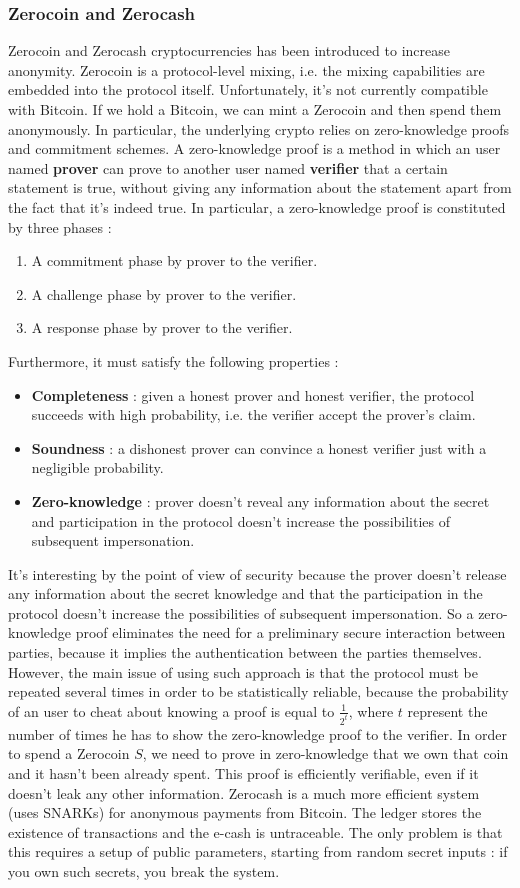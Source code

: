 \subsubsection{Zerocoin and Zerocash}
Zerocoin and Zerocash cryptocurrencies has been introduced to increase anonymity. Zerocoin is a protocol-level mixing, i.e. the mixing capabilities are embedded into the protocol itself. Unfortunately, it's not currently compatible with Bitcoin. If we hold a Bitcoin, we can mint a Zerocoin and then spend them anonymously. In particular, the underlying crypto relies on zero-knowledge proofs and commitment schemes. A zero-knowledge proof is a method in which an user named \textbf{prover} can prove to another user named \textbf{verifier} that a certain statement is true, without giving any information about the statement apart from the fact that it's indeed true. In particular, a zero-knowledge proof is constituted by three phases :
\begin{enumerate}
\item A commitment phase by prover to the verifier.
\item A challenge phase by prover to the verifier.
\item A response phase by prover to the verifier.
\end{enumerate}
Furthermore, it must satisfy the following properties :
\begin{itemize}
\item \textbf{Completeness} : given a honest prover and honest verifier, the protocol succeeds with high probability, i.e. the verifier accept the prover's claim.
\item \textbf{Soundness} : a dishonest prover can convince a honest verifier just with a negligible probability.
\item \textbf{Zero-knowledge} : prover doesn't reveal any information about the secret and participation in the protocol doesn't increase the possibilities of subsequent impersonation.
\end{itemize}
It's interesting by the point of view of security because the prover doesn't release any information about the secret knowledge and that the participation in the protocol doesn't increase the possibilities of subsequent impersonation. So a zero-knowledge proof eliminates the need for a preliminary secure interaction between parties, because it implies the authentication between the parties themselves. However, the main issue of using such approach is that the protocol must be repeated several times in order to be statistically reliable, because the probability of an user to cheat about knowing a proof is equal to $\frac{1}{2^{t}}$, where $t$ represent the number of times he has to show the zero-knowledge proof to the verifier. In order to spend a Zerocoin $S$, we need to prove in zero-knowledge that we own that coin and it hasn't been already spent. This proof is efficiently verifiable, even if it doesn't leak any other information. Zerocash is a much more efficient system (uses SNARKs) for anonymous payments from Bitcoin. The ledger stores the existence of transactions and the e-cash is untraceable. The only problem is that this requires a setup of public parameters, starting from random secret inputs : if you own such secrets, you break the system.

